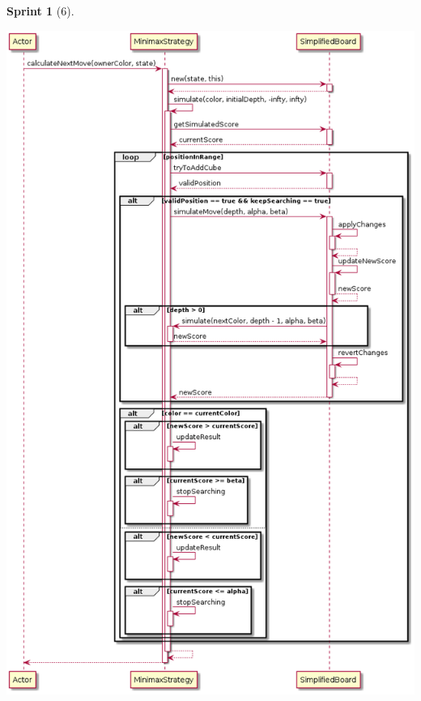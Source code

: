 \documentclass[12pt,a4paper,openright]{book}
\theoremstyle{break}
\newtheorem*{sprint}{Sprint}
\begin{document}
\begin{sprint}[6]
\begin{center}
\centering
\includegraphics[scale=0.5]{Minimax.calculateNextMove()-Sprint6.png}
\end{center}

\end{sprint}
\end{document}

